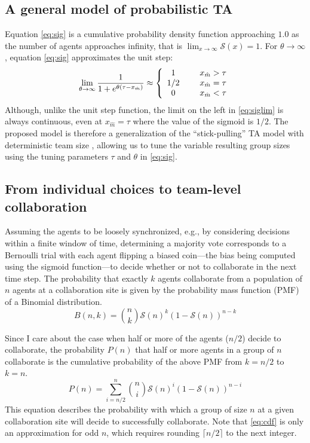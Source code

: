 \documentclass[defaultstyle,12pt]{proposal}
\newcommand{\sig}{\mathcal{S}}
\newcommand{\ceil}[1]{\lceil#1\rceil}
\newcommand{\xm}{x_{\hat{m}}}
\begin{document}
\subsection{A general model of probabilistic TA}
Equation \eqref{eq:sig} is a cumulative probability density function approaching $1.0$ as the number of agents approaches infinity, that is $\lim_{x \to \infty}\sig(x)=1$. For $\theta \to \infty$, equation \eqref{eq:sig} approximates the unit step:
\begin{equation}
\lim_{\theta \to \infty} \frac{1}{1+e^{\theta(\tau-\xm)}}\approx
\left\{
\begin{array}{cc}
 1 & \hspace{.5cm} \xm>\tau \\
 1/2 & \hspace{.5cm} \xm=\tau \\
 0 & \hspace{.5cm} \xm<\tau
\end{array}
\right.\label{eq:siglim}
\end{equation}
Although, unlike the unit step function, the limit on the left in \eqref{eq:siglim} is always continuous, even at $\xm = \tau$ where the value of the sigmoid is $1/2$. The proposed model is therefore a generalization of the ``stick-pulling'' TA model with deterministic team size \cite{Lerman2001}, allowing us to tune the variable resulting group sizes using the tuning parameters $\tau$ and $\theta$ in \eqref{eq:sig}. 

\subsection{From individual choices to team-level collaboration}
Assuming the agents to be loosely synchronized, e.g., by considering decisions within a finite window of time, determining a majority vote corresponds to a Bernoulli trial with each agent flipping a biased coin---the bias being computed using the sigmoid function---to decide whether or not to collaborate in the next time step. The probability that exactly $k$ agents collaborate from a population of $n$ agents at a collaboration site is given by the probability mass function (PMF) of a Binomial distribution.
\begin{equation}
	B(n, k) = \binom{n}{k}\sig(n)^{k}\left(1 - \sig(n)\right)^{n - k}\label{eq:binomial}
\end{equation}

Since I care about the case when half or more of the agents ($n/2$) decide to collaborate, the probability $P(n)$ that half or more agents in a group of $n$ collaborate is the cumulative probability of the above PMF from $k = {n/2}$ to $k = n$. 
\begin{equation}
	P(n) = \sum\limits_{i={n/2}}^{n}\binom{n}{i}\sig(n)^{i}\left(1 - \sig(n)\right)^{n - i}\label{eq:cdf}
\end{equation}
This equation describes the probability with which a group of size $n$ at a given collaboration site will decide to successfully collaborate.  Note that \eqref{eq:cdf} is only an approximation for odd $n$, which requires rounding $\ceil{n/2}$ to the next integer. 
\end{document}
